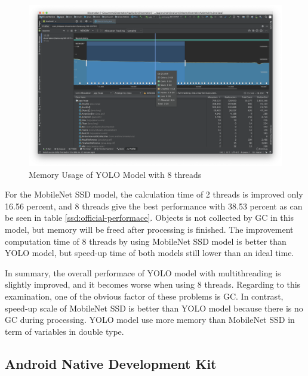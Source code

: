             \begin{figure}[!ht]
                \includegraphics[width=6in]{images/chapter5/gc-problem/gc-collecting.png}
                \caption{Memory Usage of YOLO Model with 8 threads}
                \label{yolo:memoryUsage}
            \end{figure}

            For the MobileNet SSD model,
            the calculation time of 2 threads is improved only 16.56 percent,
            and 8 threads give the best performance with 38.53 percent as can be seen in table \ref{ssd:official-performace}.
            Objects is not collected by GC in this model, but memory will be freed after processing is finished.
            The improvement computation time of 8 threads by using MobileNet SSD model is better than YOLO model,
            but speed-up time of both models still lower than an ideal time.

            In summary, the overall performace of YOLO model with multithreading is slightly improved,
            and it becomes worse when using 8 threads.
            Regarding to this examination, one of the obvious factor of these problems is
            GC.
            In contrast, speed-up scale of MobileNet SSD is better than YOLO model because there is no
            GC during processing.
            YOLO model use more memory than MobileNet SSD in term of variables in double type.

        \subsection{Android Native Development Kit}

